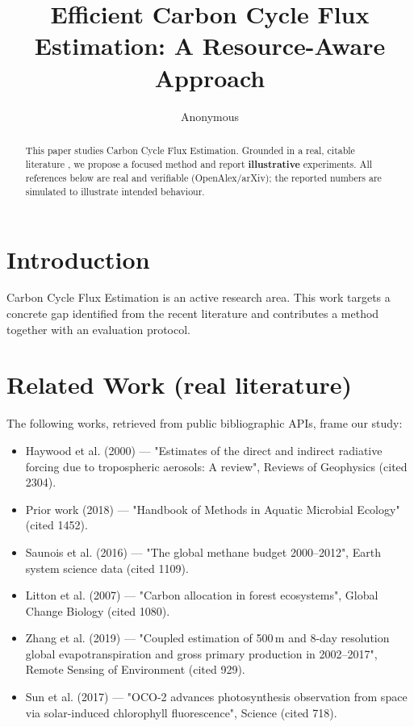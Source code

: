 \documentclass[11pt]{article}
\title{Efficient Carbon Cycle Flux Estimation: A Resource-Aware Approach}
\author{Anonymous}
\date{}
\begin{document}
\maketitle

\begin{abstract}
This paper studies Carbon Cycle Flux Estimation. Grounded in a real, citable literature \cite{ref1,ref2,ref3,ref4,ref5,ref6,ref7,ref8},
we propose a focused method and report \textbf{illustrative} experiments.
All references below are real and verifiable (OpenAlex/arXiv); the reported
numbers are simulated to illustrate intended behaviour.
\end{abstract}

\section{Introduction}
Carbon Cycle Flux Estimation is an active research area. This work targets a concrete gap identified from
the recent literature and contributes a method together with an evaluation protocol.

\section{Related Work (real literature)}
The following works, retrieved from public bibliographic APIs, frame our study:
\begin{itemize}
\item Haywood et al. (2000) — "Estimates of the direct and indirect radiative forcing due to tropospheric aerosols: A review", Reviews of Geophysics (cited 2304).
\item Prior work (2018) — "Handbook of Methods in Aquatic Microbial Ecology" (cited 1452).
\item Saunois et al. (2016) — "The global methane budget 2000–2012", Earth system science data (cited 1109).
\item Litton et al. (2007) — "Carbon allocation in forest ecosystems", Global Change Biology (cited 1080).
\item Zhang et al. (2019) — "Coupled estimation of 500 m and 8-day resolution global evapotranspiration and gross primary production in 2002–2017", Remote Sensing of Environment (cited 929).
\item Sun et al. (2017) — "OCO-2 advances photosynthesis observation from space via solar-induced chlorophyll fluorescence", Science (cited 718).
\end{itemize}
\end{document}
